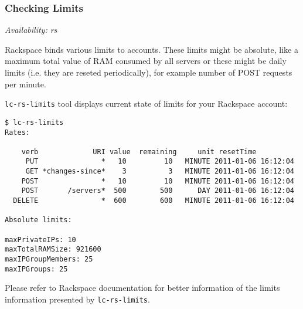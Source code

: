 \documentclass[a4paper]{report}
\begin{document}
\subsubsection{Checking Limits}

\textit{Availability: rs}

Rackspace binds various limits to accounts. These limits might be absolute, like a
maximum total value of RAM consumed by all servers or these might be daily limits
(i.e. they are reseted periodically), for example number of POST requests per minute.

\texttt{lc-rs-limits} tool displays current state of limits for your Rackspace account:

\begin{verbatim}
$ lc-rs-limits
Rates:
    
    verb             URI value  remaining     unit resetTime
     PUT               *   10         10   MINUTE 2011-01-06 16:12:04
     GET *changes-since*    3          3   MINUTE 2011-01-06 16:12:04
    POST               *   10         10   MINUTE 2011-01-06 16:12:04
    POST       /servers*  500        500      DAY 2011-01-06 16:12:04
  DELETE               *  600        600   MINUTE 2011-01-06 16:12:04

Absolute limits:

maxPrivateIPs: 10
maxTotalRAMSize: 921600
maxIPGroupMembers: 25
maxIPGroups: 25
\end{verbatim}

Please refer to Rackspace documentation for better information of the
limits information presented by \texttt{lc-rs-limits}.
\end{document}
